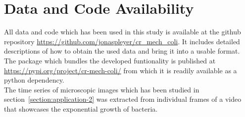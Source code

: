 \documentclass[10pt,letterpaper]{article}
\begin{document}
\section*{Data and Code Availability}
\label{section:data-code-availability}
All data and code which has been used in this study is available at the github repository
\url{https://github.com/jonaspleyer/cr\_mech\_coli}.
It includes detailed descriptions of how to obtain the used data and bring it into a usable format.
The package which bundles the developed funtionality is published at
\url{https://pypi.org/project/cr-mech-coli/} from which it is readily available as a python
dependency.\\
The time series of microscopic images which has been studied in section~\ref{section:application-2}
was extracted from individual frames of a video~\cite{Trude1982} that
showcases the exponential growth of bacteria.

\nolinenumbers
\newpage

\end{document}
